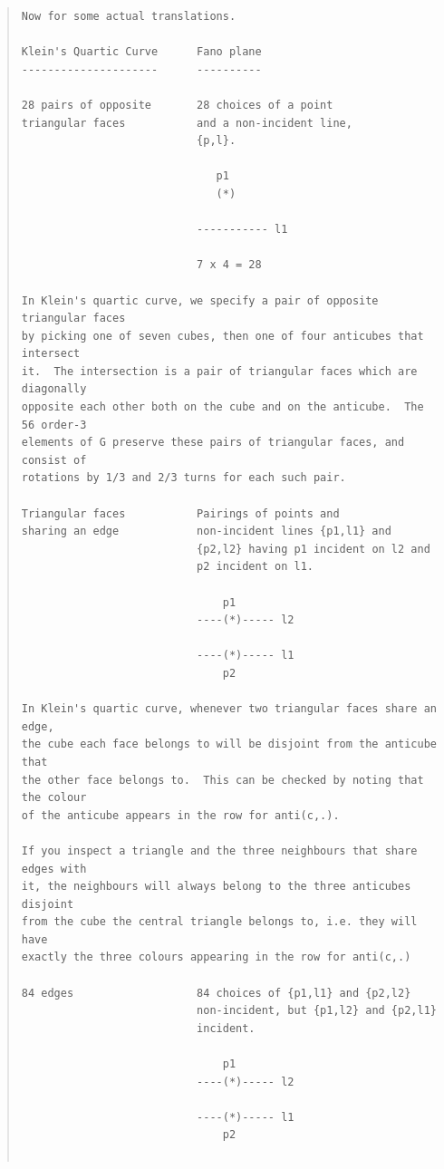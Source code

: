 \documentclass{article}
\begin{document}
\begin{quote}
\begin{verbatim}
Now for some actual translations.

Klein's Quartic Curve      Fano plane
---------------------      ----------

28 pairs of opposite       28 choices of a point
triangular faces           and a non-incident line,
                           {p,l}.

                              p1
                              (*)

                           ----------- l1

                           7 x 4 = 28

In Klein's quartic curve, we specify a pair of opposite triangular faces 
by picking one of seven cubes, then one of four anticubes that intersect 
it.  The intersection is a pair of triangular faces which are diagonally 
opposite each other both on the cube and on the anticube.  The 56 order-3 
elements of G preserve these pairs of triangular faces, and consist of 
rotations by 1/3 and 2/3 turns for each such pair.

Triangular faces           Pairings of points and
sharing an edge            non-incident lines {p1,l1} and
                           {p2,l2} having p1 incident on l2 and
                           p2 incident on l1.

                               p1
                           ----(*)----- l2

                           ----(*)----- l1
                               p2

In Klein's quartic curve, whenever two triangular faces share an edge, 
the cube each face belongs to will be disjoint from the anticube that 
the other face belongs to.  This can be checked by noting that the colour 
of the anticube appears in the row for anti(c,.).

If you inspect a triangle and the three neighbours that share edges with 
it, the neighbours will always belong to the three anticubes disjoint 
from the cube the central triangle belongs to, i.e. they will have 
exactly the three colours appearing in the row for anti(c,.)

84 edges                   84 choices of {p1,l1} and {p2,l2}
                           non-incident, but {p1,l2} and {p2,l1}
                           incident.

                               p1
                           ----(*)----- l2

                           ----(*)----- l1
                               p2


\end{verbatim}
\end{quote}
\end{document}
